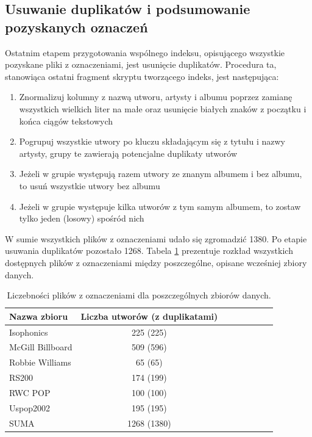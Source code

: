 \subsection{Usuwanie duplikatów i podsumowanie pozyskanych oznaczeń}

Ostatnim etapem przygotowania wspólnego indeksu, opisującego wszystkie pozyskane pliki z oznaczeniami, jest usunięcie duplikatów. Procedura ta, stanowiąca ostatni fragment skryptu tworzącego indeks, jest następująca:

\begin{enumerate}
    \item Znormalizuj kolumny z nazwą utworu, artysty i albumu poprzez zamianę wszystkich wielkich
        liter na małe oraz usunięcie białych znaków z początku i końca ciągów tekstowych
    \item Pogrupuj wszystkie utwory po kluczu składającym się z tytułu i nazwy artysty, grupy te
        zawierają potencjalne duplikaty utworów
    \item Jeżeli w grupie występują razem utwory ze znanym albumem i bez albumu, to usuń wszystkie
        utwory bez albumu
    \item Jeżeli w grupie występuje kilka utworów z tym samym albumem, to zostaw tylko jeden
        (losowy) spośród nich
\end{enumerate}

W sumie wszystkich plików z oznaczeniami udało się zgromadzić 1380. Po etapie usuwania duplikatów pozostało 1268. Tabela \ref{tab:datasets1} prezentuje rozkład wszystkich dostępnych plików z oznaczeniami między poszczególne, opisane wcześniej zbiory danych.

\begin{table}
    \centering
    \caption{Liczebności plików z oznaczeniami dla poszczególnych zbiorów danych.}
    \label{tab:datasets1}
    \begin{tabular}{|l|c|c|c|c|c|c|c|} \hline
        Nazwa zbioru & Liczba utworów (z duplikatami) \\ \hline
        Isophonics & 225 (225) \\
        McGill Billboard & 509 (596) \\
        Robbie Williams & 65 (65) \\
        RS200 & 174 (199) \\
        RWC POP & 100 (100) \\
        Uspop2002 & 195 (195) \\
        SUMA & 1268 (1380) \\ \hline
    \end{tabular}
\end{table}


